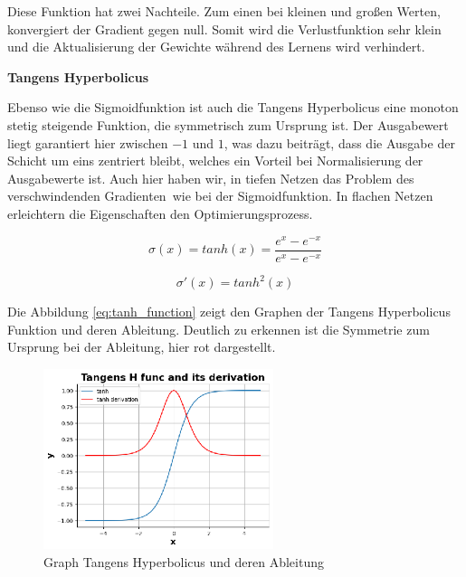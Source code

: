 Diese Funktion hat zwei Nachteile. Zum einen bei kleinen und großen Werten, konvergiert der Gradient gegen null. Somit wird die Verlustfunktion sehr klein und die Aktualisierung der Gewichte während des Lernens wird verhindert.\vspace{0.2cm}

%
\textbf{Tangens Hyperbolicus}\vspace{0.2cm}

Ebenso wie die Sigmoidfunktion ist auch die Tangens Hyperbolicus eine monoton stetig steigende Funktion, die symmetrisch zum Ursprung ist. Der Ausgabewert liegt garantiert hier zwischen $-1$ und $1$, was dazu beiträgt, dass die Ausgabe der Schicht um eins zentriert bleibt, welches ein Vorteil bei Normalisierung der Ausgabewerte ist. Auch hier haben wir, in tiefen Netzen das \glqq Problem des verschwindenden Gradienten\grqq \ wie bei der Sigmoidfunktion. In flachen Netzen erleichtern die Eigenschaften den Optimierungsprozess.\vspace{0.2cm}

\begin{equation}\label{eq:tanh_function}
	\sigma (x) = tanh(x) = \frac{e^{x} - e^{-x}}{e^{x} - e^{-x}}
\end{equation}

\begin{equation}\label{eq:derivative_tanh_function}
	\sigma' (x) = tanh^2(x)
\end{equation}

Die Abbildung \ref{eq:tanh_function} zeigt den Graphen der Tangens Hyperbolicus Funktion und deren Ableitung. Deutlich zu erkennen ist die Symmetrie zum Ursprung bei der Ableitung, hier rot dargestellt.

\begin{figure}[!ht]
	\includegraphics[width=0.6\textwidth]{content/chapter_basics/plots/tanh_func_plot.eps}
	\centering
	\caption{Graph Tangens Hyperbolicus und deren Ableitung}
	\label{img:tanh_func_graph}
\end{figure}

